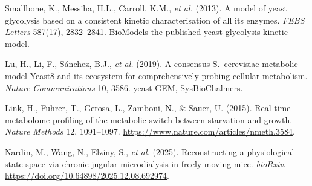 \documentclass[11pt]{article}
\begin{document}
\begin{table}[H]
\centering
\small
{}
\caption{Where each target stands. Only the first row is a validated,
leak-free result; the rest is the work ahead.}
\label{tab:status}
\end{table}


\begin{thebibliography}{9}

Smallbone, K., Messiha, H.L., Carroll, K.M., \emph{et al.} (2013).
A model of yeast glycolysis based on a consistent kinetic characterisation
of all its enzymes. \emph{FEBS Letters} 587(17), 2832--2841.
BioModels the published yeast glycolysis kinetic model.

Lu, H., Li, F., S{\'a}nchez, B.J., \emph{et al.} (2019).
A consensus S.\ cerevisiae metabolic model Yeast8 and its ecosystem for
comprehensively probing cellular metabolism. \emph{Nature Communications}
10, 3586. yeast-GEM, SysBioChalmers.

Link, H., Fuhrer, T., Gerosa, L., Zamboni, N., \& Sauer, U. (2015).
Real-time metabolome profiling of the metabolic switch between starvation
and growth. \emph{Nature Methods} 12, 1091--1097.
\url{https://www.nature.com/articles/nmeth.3584}.

Nardin, M., Wang, N., Elziny, S., \emph{et al.} (2025).
Reconstructing a physiological state space via chronic jugular
microdialysis in freely moving mice. \emph{bioRxiv}.
\url{https://doi.org/10.64898/2025.12.08.692974}.

\end{thebibliography}
\end{document}
